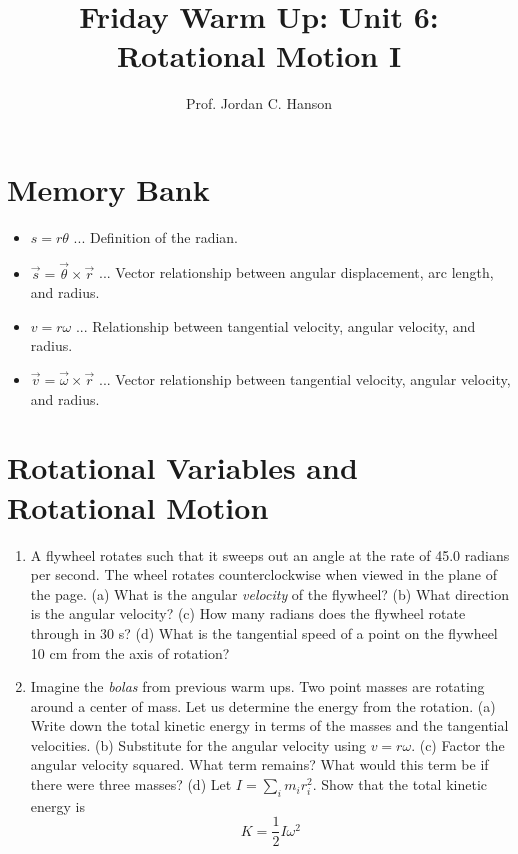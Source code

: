 \documentclass{article}
\begin{document}
\twocolumn

\title{Friday Warm Up: Unit 6: Rotational Motion I}
\author{Prof. Jordan C. Hanson}

\maketitle

\section{Memory Bank}

\begin{itemize}
\item $s = r \theta$ ... Definition of the radian.
\item $\vec{s} = \vec{\theta} \times \vec{r}$ ... Vector relationship between angular displacement, arc length, and radius.
\item $v = r \omega$ ... Relationship between tangential velocity, angular velocity, and radius.
\item $\vec{v} = \vec{\omega} \times \vec{r}$ ... Vector relationship between tangential velocity, angular velocity, and radius.
\end{itemize}

\section{Rotational Variables and Rotational Motion}

\begin{enumerate}
\item A flywheel rotates such that it sweeps out an angle at the rate of 45.0 radians per second. The wheel rotates counterclockwise when viewed in the plane of the page. (a) What is the angular \textit{velocity} of the flywheel? (b) What direction is the angular velocity? (c) How many radians does the flywheel rotate through in 30 s? (d) What is the tangential speed of a point on the flywheel 10 cm from the axis of rotation? \\ \vspace{3cm}
\item Imagine the \textit{bolas} from previous warm ups.  Two point masses are rotating around a center of mass.  Let us determine the energy from the rotation.  (a) Write down the total kinetic energy in terms of the masses and the tangential velocities. (b) Substitute for the angular velocity using $v = r\omega$. (c) Factor the angular velocity squared.  What term remains?  What would this term be if there were three masses? (d) Let $I = \sum_i m_i r_i^2$. Show that the total kinetic energy is
\begin{equation}
K = \frac{1}{2}I \omega^2
\end{equation}
\end{enumerate}
\end{document}
